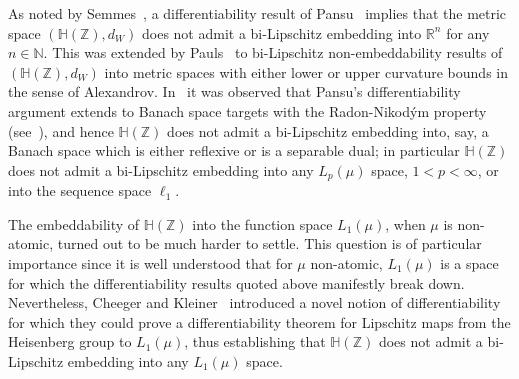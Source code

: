 \documentclass{icm2010}
\theoremstyle{definition}
\newcommand{\R}{\mathbb{R}}
\newcommand{\1}{\mathbf{1}}
\newcommand{\N}{\mathbb{N}}
\renewcommand{\H}{\mathbb{H}}
\newcommand{\Z}{\mathbb{Z}}
\begin{document}
As noted by Semmes~\cite{Sem96}, a  differentiability
result of Pansu~\cite{Pan89} implies that the metric space
$(\H(\Z),d_W)$ does not admit a bi-Lipschitz embedding into $\R^n$
for any $n\in \N$. This was extended by Pauls~\cite{Pau01} to
bi-Lipschitz non-embeddability results of $(\H(\Z),d_W)$ into metric
spaces with either lower or upper curvature bounds in the sense of
Alexandrov. In~\cite{LN06,CK06-RNP} it was observed that Pansu's
differentiability argument extends to Banach space targets with the
Radon-Nikod\'ym property (see~\cite[Ch.\ 5]{benlin}), and hence
$\H(\Z)$ does not admit a bi-Lipschitz embedding into, say, a Banach
space which is either reflexive or is a separable dual; in
particular $\H(\Z)$ does not admit a bi-Lipschitz embedding into any
$L_p(\mu)$ space, $1<p<\infty$, or into the sequence space $\ell_1$.


The embeddability of $\H(\Z)$ into the function space $L_1(\mu)$,
when $\mu$ is non-atomic, turned out to be much harder to settle.
This question is of particular importance since it is well
understood that for $\mu$ non-atomic, $L_1(\mu)$ is a space for
which the differentiability results quoted above manifestly break
down. Nevertheless, Cheeger and Kleiner~\cite{CK-Cras,ckbv}
introduced a novel notion of differentiability for which they could
prove a differentiability theorem for Lipschitz maps from the
Heisenberg group to $L_1(\mu)$, thus establishing that $\H(\Z)$ does
not admit a bi-Lipschitz embedding into any $L_1(\mu)$ space.
\end{document}
